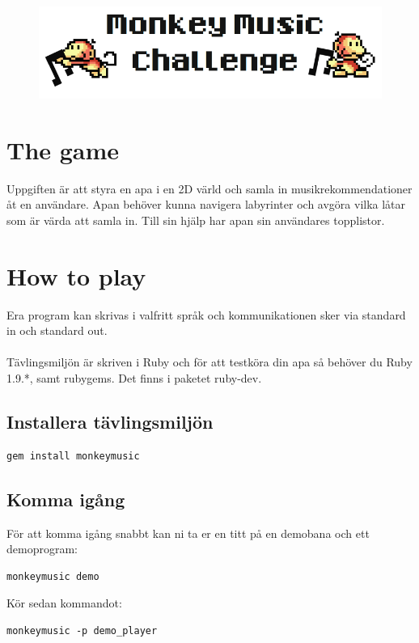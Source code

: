 \documentclass[a4paper, 10pt]{article}
\begin{document}
\begin{figure}
\centering
\includegraphics[scale=0.4]{logo}
\end{figure}
\newpage

\section*{The game}
Uppgiften är att styra en apa i en 2D värld och samla in musikrekommendationer åt en användare. Apan behöver kunna navigera labyrinter och avgöra vilka låtar som är värda att samla in. Till sin hjälp har apan sin användares topplistor.

\section*{How to play}
Era program kan skrivas i valfritt språk och kommunikationen sker via standard in och standard out. \\\\
Tävlingsmiljön är skriven i Ruby och för att testköra din apa så behöver du Ruby 1.9.*, samt rubygems. Det finns i paketet ruby-dev.

\subsection*{Installera tävlingsmiljön}

\begin{verbatim}
gem install monkeymusic
\end{verbatim}

\subsection*{Komma igång}

För att komma igång snabbt kan ni ta er en titt på en demobana och ett demoprogram:

\begin{verbatim}
monkeymusic demo
\end{verbatim}

Kör sedan kommandot:

\begin{verbatim}
monkeymusic -p demo_player
\end{verbatim}
\end{document}

